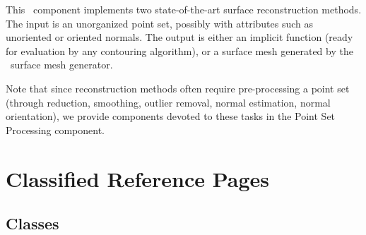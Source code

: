 


This \cgal\ component implements two state-of-the-art surface reconstruction methods. The input is an unorganized point set, possibly with attributes such as unoriented or oriented normals. The output is either an implicit function (ready for evaluation by any contouring algorithm), or a surface mesh generated by the \cgal\ surface mesh generator.

Note that since reconstruction methods often require pre-processing a point set (through reduction, smoothing, outlier removal, normal estimation, normal orientation), we provide components devoted to these tasks in the Point Set Processing component.

\section{Classified Reference Pages}

\subsection{Classes}

  \\
  \\

